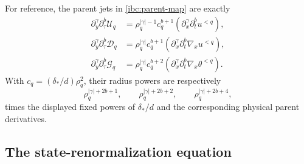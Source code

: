 For reference, the parent jets in \eqref{ibc:parent-map} are exactly
\begin{align}
 \partial_y^\gamma\partial_\tau^b\mathcal U_q
 &=\rho_q^{|\gamma|-1}c_q^{b+1}
   (\partial_x^\gamma\partial_t^bu^{<q}),
 \label{ibc:parent-u-jets}\\
 \partial_y^\gamma\partial_\tau^b\mathcal D_q
 &=\rho_q^{|\gamma|}c_q^{b+1}
   (\partial_x^\gamma\partial_t^b\nabla_xu^{<q}),
 \label{ibc:parent-d-jets}\\
 \partial_y^\gamma\partial_\tau^b\mathcal G_q
 &=\rho_q^{|\gamma|}c_q^{b+2}
   (\partial_x^\gamma\partial_t^b\nabla_x\theta^{<q}).
 \label{ibc:parent-g-jets}
\end{align}
With $c_q=(\delta_*/d)\rho_q^2$, their radius powers are respectively
\begin{equation}\label{ibc:parent-radius-powers}
 \rho_q^{|\gamma|+2b+1},\qquad
 \rho_q^{|\gamma|+2b+2},\qquad
 \rho_q^{|\gamma|+2b+4},
\end{equation}
times the displayed fixed powers of $\delta_*/d$ and the corresponding
physical parent derivatives.

\subsection{The state-renormalization equation}

